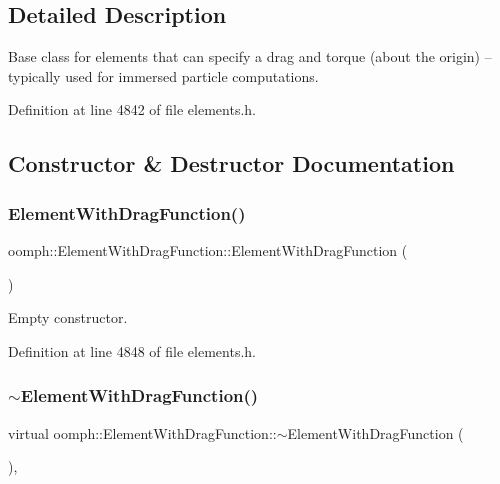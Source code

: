\subsection{Detailed Description}
Base class for elements that can specify a drag and torque (about the origin) -- typically used for immersed particle computations. 

Definition at line 4842 of file elements.\+h.



\subsection{Constructor \& Destructor Documentation}
\mbox{\label{classoomph_1_1ElementWithDragFunction_aff661f6ae5361aac6de44519298c9bc0}} 
\subsubsection{\texorpdfstring{Element\+With\+Drag\+Function()}{ElementWithDragFunction()}}
{\footnotesize\ttfamily oomph\+::\+Element\+With\+Drag\+Function\+::\+Element\+With\+Drag\+Function (\begin{DoxyParamCaption}{ }\end{DoxyParamCaption})\hspace{0.3cm}{\ttfamily [inline]}}



Empty constructor. 



Definition at line 4848 of file elements.\+h.

\mbox{\label{classoomph_1_1ElementWithDragFunction_a8ee7ce8b20bff27133c746d03f24924d}} 
\subsubsection{\texorpdfstring{$\sim$\+Element\+With\+Drag\+Function()}{~ElementWithDragFunction()}}
{\footnotesize\ttfamily virtual oomph\+::\+Element\+With\+Drag\+Function\+::$\sim$\+Element\+With\+Drag\+Function (\begin{DoxyParamCaption}{ }\end{DoxyParamCaption})\hspace{0.3cm}{\ttfamily [inline]}, {\ttfamily [virtual]}}



